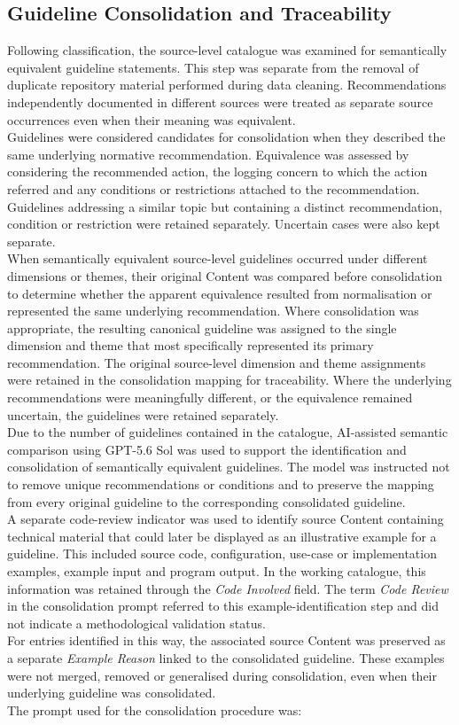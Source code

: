 \subsection{Guideline Consolidation and Traceability}

Following classification, the source-level catalogue was examined for semantically
equivalent guideline statements. This step was separate from the removal of duplicate
repository material performed during data cleaning. Recommendations independently
documented in different sources were treated as separate source occurrences even when
their meaning was equivalent.
\\
Guidelines were considered candidates for consolidation when they described the same
underlying normative recommendation. Equivalence was assessed by considering the
recommended action, the logging concern to which the action referred and any conditions
or restrictions attached to the recommendation. Guidelines addressing a similar topic
but containing a distinct recommendation, condition or restriction were retained
separately. Uncertain cases were also kept separate.
\\
When semantically equivalent source-level guidelines occurred under different
dimensions or themes, their original Content was compared before consolidation
to determine whether the apparent equivalence resulted from normalisation or
represented the same underlying recommendation. Where consolidation was
appropriate, the resulting canonical guideline was assigned to the single
dimension and theme that most specifically represented its primary
recommendation. The original source-level dimension and theme assignments were
retained in the consolidation mapping for traceability. Where the underlying
recommendations were meaningfully different, or the equivalence remained
uncertain, the guidelines were retained separately.
\\
Due to the number of guidelines contained in the catalogue, AI-assisted semantic
comparison using GPT-5.6 Sol was used to support the identification and consolidation
of semantically equivalent guidelines. The model was instructed not to remove unique
recommendations or conditions and to preserve the mapping from every original guideline
to the corresponding consolidated guideline.
\\
A separate code-review indicator was used to identify source Content containing
technical material that could later be displayed as an illustrative example for a
guideline. This included source code, configuration, use-case or implementation examples,
example input and program output. In the working catalogue, this information was retained
through the \textit{Code Involved} field. The term \textit{Code Review} in the
consolidation prompt referred to this example-identification step and did not indicate
a methodological validation status.
\\
For entries identified in this way, the associated source Content was preserved as a
separate \textit{Example Reason} linked to the consolidated guideline. These examples
were not merged, removed or generalised during consolidation, even when their underlying
guideline was consolidated.
\\
The prompt used for the consolidation procedure was:


